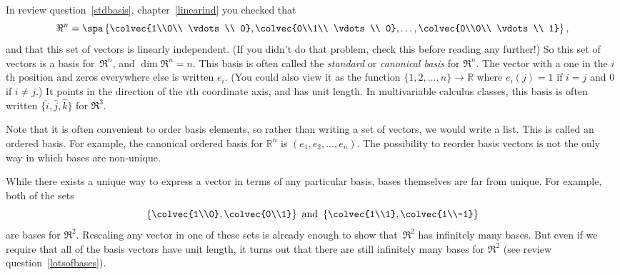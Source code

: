 In review question~\ref{stdbasis}, chapter~\ref{linearind} you checked that
\[
\Re^n = \spa \left\{ \colvec{1\\0\\ \vdots \\ 0}, 
\colvec{0\\1\\ \vdots \\ 0}, \ldots, \colvec{0\\0\\ \vdots \\ 1}\right\},
\]
and that this set of vectors is linearly independent. (If you didn't do that problem, check this before reading any further!)  So this set of vectors is a basis for~$\Re^n$, and $\dim \Re^n=n$.  This basis is often called the \emph{standard} or \emph{canonical basis} for $\Re^n$.  The vector with a one in the $i$th position and zeros everywhere else is written 
$e_i$. (You could also view it as the function $\{1,2,\ldots,n\}\to {\mathbb R}$ where $e_i(j)=1$ if $i=j$ and $0$ if $i\neq j$.)  It points in the direction of the $i$th coordinate axis, and has unit length.  In multivariable calculus classes, this basis is often written $\{ \hat i,\hat j,\hat k \}$ for $\Re^3$. 


Note that it is often convenient to order  basis elements, so rather than writing a set
of vectors, we would write a list. This is called an ordered basis. For example, the canonical ordered basis for ${\mathbb R^n}$ is $(e_1,e_2,\ldots,e_n)$. The possibility to reorder basis vectors is not the only way in which bases are non-unique.

\begin{remark}
While there exists a unique way to express a vector in terms of any particular basis, bases themselves are far from unique.
For example, both of the sets 
\[
\left\{ \colvec{1\\0}, \colvec{0\\1} \right\} \text{ and }
\left\{ \colvec{1\\1}, \colvec{1\\-1} \right\}
\]
are bases for $\Re^2$.  Rescaling any vector in one of these sets is already enough to show that~$\Re^2$ has infinitely many bases.  But even if we require that all of the basis vectors have unit length, it turns out that there are still infinitely many bases for $\Re^2$ (see review question~\ref{lotsofbases}).
\end{remark}


